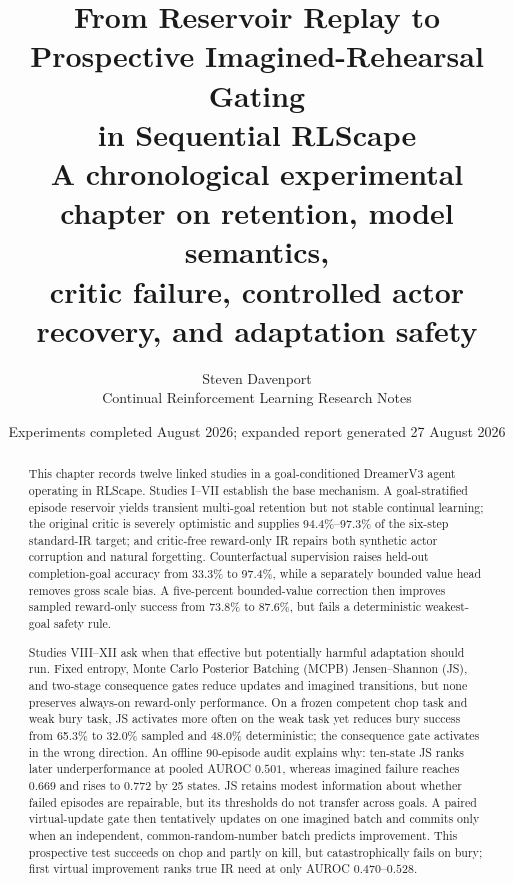 \documentclass[10pt]{article}
\title{\textbf{From Reservoir Replay to Prospective Imagined-Rehearsal Gating\\in Sequential RLScape}\\[3pt]
\large A chronological experimental chapter on retention, model semantics,\\critic failure, controlled actor recovery, and adaptation safety}
\author{Steven Davenport\\Continual Reinforcement Learning Research Notes}
\date{Experiments completed August 2026; expanded report generated 27 August 2026}
\newcommand{\pct}[1]{#1\%}
\begin{document}
\maketitle

\begin{abstract}
This chapter records twelve linked studies in a goal-conditioned DreamerV3 agent operating in RLScape. Studies I--VII establish the base mechanism. A goal-stratified episode reservoir yields transient multi-goal retention but not stable continual learning; the original critic is severely optimistic and supplies \pct{94.4}--\pct{97.3} of the six-step standard-IR target; and critic-free reward-only IR repairs both synthetic actor corruption and natural forgetting. Counterfactual supervision raises held-out completion-goal accuracy from \pct{33.3} to \pct{97.4}, while a separately bounded value head removes gross scale bias. A five-percent bounded-value correction then improves sampled reward-only success from \pct{73.8} to \pct{87.6}, but fails a deterministic weakest-goal safety rule.

Studies VIII--XII ask when that effective but potentially harmful adaptation should run. Fixed entropy, Monte Carlo Posterior Batching (MCPB) Jensen--Shannon (JS), and two-stage consequence gates reduce updates and imagined transitions, but none preserves always-on reward-only performance. On a frozen competent chop task and weak bury task, JS activates more often on the weak task yet reduces bury success from \pct{65.3} to \pct{32.0} sampled and \pct{48.0} deterministic; the consequence gate activates in the wrong direction. An offline 90-episode audit explains why: ten-state JS ranks later underperformance at pooled AUROC $0.501$, whereas imagined failure reaches $0.669$ and rises to $0.772$ by 25 states. JS retains modest information about whether failed episodes are repairable, but its thresholds do not transfer across goals. A paired virtual-update gate then tentatively updates on one imagined batch and commits only when an independent, common-random-number batch predicts improvement. This prospective test succeeds on chop and partly on kill, but catastrophically fails on bury; first virtual improvement ranks true IR need at only AUROC $0.470$--$0.528$.


\end{abstract}
\end{document}

